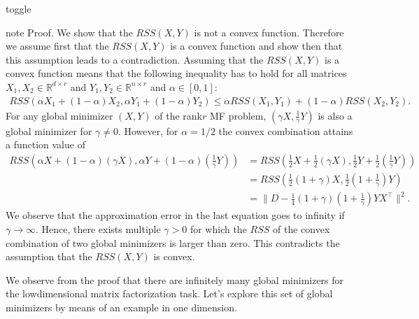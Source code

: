 \documentclass[letterpaper,10pt,english]{jupyterBook}
\begin{document}
\begin{sphinxuseclass}{toggle}
\begin{sphinxadmonition}{note}
\sphinxAtStartPar
Proof. We show that the \(RSS(X,Y)\) is not a convex function. Therefore we assume first that the \(RSS(X,Y)\) is a convex function and show then that this assumption leads to a contradiction. Assuming that the \(RSS(X,Y)\) is a convex function means that the following inequality has to hold for all matrices \(X_1,X_2\in\mathbb{R}^{d\times r}\) and \(Y_1,Y_2\in\mathbb{R}^{n\times r}\) and \(\alpha\in[0,1]\):
\label{equation:dim_reduction_mf:320ffac3-9ac3-4bb7-a1e6-0e28d92a629b}\begin{align}
        RSS(\alpha X_1+ (1-\alpha)X_2,\alpha Y_1 + (1-\alpha)Y_2) \leq \alpha RSS(X_1,Y_1) + (1-\alpha)RSS(X_2,Y_2).
\end{align}
\sphinxAtStartPar
For any global minimizer \((X,Y)\) of the rank\sphinxhyphen{}\(r\) MF problem, \((\gamma X, \frac{1}{\gamma} Y)\) is also a global minimizer for \(\gamma\neq 0\).
However, for \(\alpha=1/2\) the convex combination attains a function value of
\begin{align*}
    RSS(\alpha X + (1-\alpha) (\gamma X), \alpha Y+(1-\alpha)(\tfrac1\gamma Y)) &=RSS\left(\tfrac12 X + \tfrac12 (\gamma X), \tfrac12 Y+\tfrac12(\tfrac1\gamma Y)\right)\\
    &= RSS\left(\tfrac12(1+\gamma) X, \tfrac12(1+ \tfrac1\gamma) Y\right)\\
    &=\lVert D-\tfrac14(1+\gamma)(1+\tfrac1\gamma)YX^\top\rVert^2.
\end{align*}
\sphinxAtStartPar
We observe that the approximation error in the last equation goes to infinity if \(\gamma\rightarrow \infty\). Hence, there exists multiple \(\gamma>0\) for which the \(RSS\) of the convex combination of two global minimizers is larger than zero. This contradicts the assumption that the \(RSS(X,Y)\) is convex.
\end{sphinxadmonition}

\end{sphinxuseclass}
\sphinxAtStartPar
We observe from the proof that there are infinitely many global minimizers for the low\sphinxhyphen{}dimensional matrix factorization task. Let’s explore this set of global minimizers by means of an example in one dimension.
\label{dim_reduction_mf:example-1}
\end{document}
